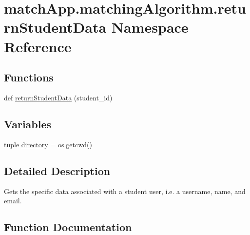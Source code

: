 \hypertarget{namespacematch_app_1_1matching_algorithm_1_1return_student_data}{}\section{match\+App.\+matching\+Algorithm.\+return\+Student\+Data Namespace Reference}
\label{namespacematch_app_1_1matching_algorithm_1_1return_student_data}
\subsection*{Functions}
\begin{DoxyCompactItemize}
\item 
def \hyperlink{namespacematch_app_1_1matching_algorithm_1_1return_student_data_aadc06526a9af52d8864f9851ae71662f}{return\+Student\+Data} (student\+\_\+id)
\end{DoxyCompactItemize}
\subsection*{Variables}
\begin{DoxyCompactItemize}
\item 
tuple \hyperlink{namespacematch_app_1_1matching_algorithm_1_1return_student_data_ab2cef55c1c53d129afdc745b17bfdb6c}{directory} = os.\+getcwd()
\end{DoxyCompactItemize}


\subsection{Detailed Description}
\begin{DoxyVerb}Gets the specific data associated with a student user, i.e. a username, name, and email. 
\end{DoxyVerb}
 

\subsection{Function Documentation}
\hypertarget{namespacematch_app_1_1matching_algorithm_1_1return_student_data_aadc06526a9af52d8864f9851ae71662f}{}
